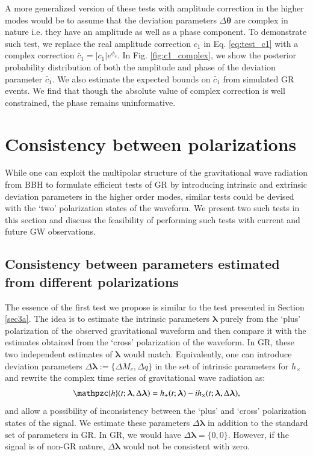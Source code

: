 \documentclass[prd,preprintnumbers,twocolumn,eqsecnum,floatfix,a4paper,nofootinbib,superscriptaddress]{revtex4}
\newcommand{\h}{\mathpzc{h}}
\newcommand{\blambda}{\bm{\lambda}}
\newcommand{\btheta}{\bm{\theta}}
\begin{document}
A more generalized version of these tests with amplitude correction in the higher modes would be to assume that the deviation parameters $\Delta \btheta$ are complex in nature i.e. they have an amplitude as well as a phase component. To demonstrate such test, we replace the real amplitude correction $c_1$ in Eq. \ref{eq:test_c1} with a complex correction $\tilde{c_1}=|c_1|e^{\phi_c}$. In Fig. \ref{fig:c1_complex}, we show the posterior probability distribution of both the amplitude and phase of the deviation parameter $\tilde{c_1}$. We also estimate the expected bounds on $\tilde{c_1}$ from simulated GR events. We find that though the absolute value of complex correction is well constrained, the phase remains uninformative. 




\section{Consistency between polarizations}
\label{sec4}
While one can exploit the multipolar structure of the gravitational wave radiation from BBH to formulate efficient tests of GR by introducing intrinsic and extrinsic deviation parameters in the higher order modes, similar tests could be devised with the `two' polarization states of the waveform. We present two such tests in this section and discuss the feasibility of performing such tests with current and future GW observations.
 
\subsection{Consistency between parameters estimated from different polarizations}
\label{sec4a}
The essence of the first test we propose is similar to the test presented in Section \ref{sec3a}. The idea is to estimate the intrinsic parameters $\blambda$ purely from the `plus' polarization of the observed gravitational waveform and then compare it with the estimates obtained from the `cross' polarization of the waveform. In GR, these two independent estimates of $\blambda$ would match. Equivalently, one can introduce deviation parameters $\Delta \blambda := \{\Delta M_c, \Delta q\}$ in the set of intrinsic parameters for $h_\times$ and rewrite the complex time series of gravitational wave radiation as:
\begin{eqnarray} 
\h(t; \blambda, \Delta \blambda) =  h_+(t; \blambda) - ih_\times(t; \blambda, \Delta \blambda),
\label{eq:test_hp_hc}
\end{eqnarray}
and allow a possibility of inconsistency between the `plus' and `cross' polarization states of the signal. We estimate these parameters $\Delta \blambda$ in addition to the standard set of parameters in GR. In GR, we would have $\Delta \blambda = \{0,0\}$. However, if the signal is of non-GR nature, $\Delta \blambda$ would not be consistent with zero.
\end{document}
